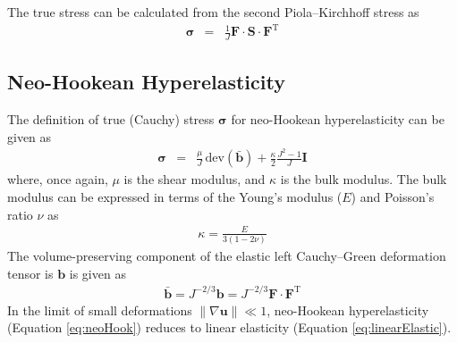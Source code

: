 \documentclass[sn-mathphys,Numbered]{sn-jnl}%
\newcommand{\bb}{\boldsymbol}
\begin{document}
\begin{appendices}
The true stress can be calculated from the second Piola–Kirchhoff stress as
\begin{eqnarray} \label{eq:S2sigma}
	\bb{\sigma} &=& \frac{1}{J} \bb{F} \cdot \bb{S} \cdot \bb{F}^{\text{T}}
\end{eqnarray}



\subsection{Neo-Hookean Hyperelasticity}
The definition of true (Cauchy) stress $\bb{\sigma}$ for neo-Hookean hyperelasticity can be given as
\begin{eqnarray} \label{eq:neoHook}
	\bb{\sigma}
	&=& \frac{\mu}{J} \, \text{dev} \left( \bar{\bb{b}} \right) + \frac{\kappa}{2} \frac{J^2 - 1}{J} \textbf{I}
\end{eqnarray}
where, once again, $\mu$ is the shear modulus, and $\kappa$ is the bulk modulus.
The bulk modulus can be expressed in terms of the Young's modulus ($E$) and Poisson's ratio $\nu$ as
\begin{eqnarray}
	\kappa = \frac{E}{3(1 - 2\nu)}
\end{eqnarray}
The volume-preserving component of the elastic left Cauchy--Green deformation tensor is $\boldsymbol{b}$ is given as
\begin{eqnarray}
	\bar{\bb{b}} = J^{-2/3} \bb{b} = J^{-2/3} \bb{F} \cdot \bb{F}^{\text{T}}
\end{eqnarray}
In the limit of small deformations $\lVert \nabla \mathbf{u} \rVert  \ll 1$, neo-Hookean hyperelasticity (Equation \ref{eq:neoHook}) reduces to linear elasticity (Equation \ref{eq:linearElastic}).


\end{appendices}
\end{document}
